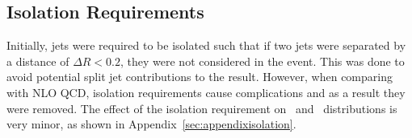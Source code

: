 \subsection{Isolation Requirements}
Initially, jets were required to be isolated such that if two jets were separated by a distance of $\Delta R < 0.2$, they were not considered in the event. This was done to avoid potential split jet contributions to the result. However, when comparing with NLO QCD, isolation requirements cause complications and as a result they were removed. The effect of the isolation requirement on \conetwo\ and \ionetwo\ distributions is very minor, as shown in Appendix~\ref{sec:appendixisolation}.


\FloatBarrier